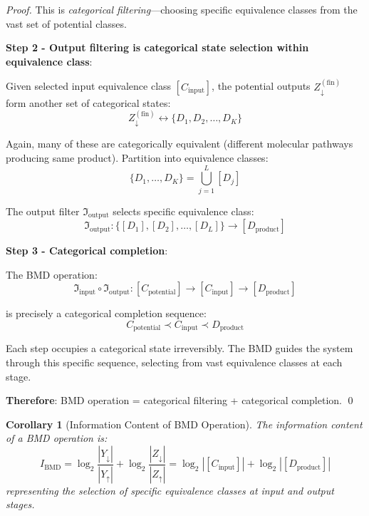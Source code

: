 \documentclass[11pt]{article}
\newtheorem{corollary}[theorem]{Corollary}
\theoremstyle{remark}
\begin{document}
\begin{proof}
This is \textit{categorical filtering}—choosing specific equivalence classes from the vast set of potential classes.

\textbf{Step 2 - Output filtering is categorical state selection within equivalence class}:

Given selected input equivalence class $[C_{\text{input}}]$, the potential outputs $Z_{\downarrow}^{(\text{fin})}$ form another set of categorical states:
\begin{equation}
Z_{\downarrow}^{(\text{fin})} \leftrightarrow \{D_1, D_2, \ldots, D_K\}
\end{equation}

Again, many of these are categorically equivalent (different molecular pathways producing same product). Partition into equivalence classes:
\begin{equation}
\{D_1, \ldots, D_K\} = \bigcup_{j=1}^L [D_j]
\end{equation}

The output filter $\Im_{\text{output}}$ selects specific equivalence class:
\begin{equation}
\Im_{\text{output}}: \{[D_1], [D_2], \ldots, [D_L]\} \to [D_{\text{product}}]
\end{equation}

\textbf{Step 3 - Categorical completion}:

The BMD operation:
\begin{equation}
\Im_{\text{input}} \circ \Im_{\text{output}}: [C_{\text{potential}}] \to [C_{\text{input}}] \to [D_{\text{product}}]
\end{equation}

is precisely a categorical completion sequence:
\begin{equation}
C_{\text{potential}} \prec C_{\text{input}} \prec D_{\text{product}}
\end{equation}

Each step occupies a categorical state irreversibly. The BMD guides the system through this specific sequence, selecting from vast equivalence classes at each stage.

\textbf{Therefore}: BMD operation = categorical filtering + categorical completion. \qed
\end{proof}

\begin{corollary}[Information Content of BMD Operation]
\label{cor:bmd_information}
The information content of a BMD operation is:
\begin{equation}
I_{\text{BMD}} = \log_2 \frac{|Y_{\downarrow}|}{|Y_{\uparrow}|} + \log_2 \frac{|Z_{\downarrow}|}{|Z_{\uparrow}|} = \log_2 |[C_{\text{input}}]| + \log_2 |[D_{\text{product}}]|
\end{equation}
representing the selection of specific equivalence classes at input and output stages.
\end{corollary}
\end{document}
